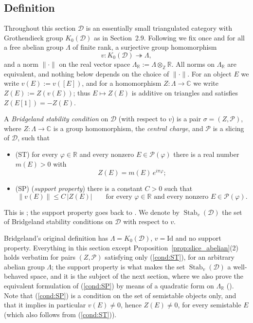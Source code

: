 \documentclass[12pt]{amsart}
\makeatletter
\newcommand{\condlabel}[2]{\phantomsection\def\@currentlabel{#1}\label{#2}\textup{(#1)}}
\newcommand{\condref}[1]{\textup{(\ref{#1})}}
\newenvironment{remark}{{\textbf{Remark.}}}
\numberwithin{theorem}{section}
\theoremstyle{definition}
\newcommand{\CC}{\mathbb{C}}
\newcommand{\RR}{\mathbb{R}}
\newcommand{\ZZ}{\mathbb{Z}}
\newcommand{\calP}{\mathcal{P}}
\newcommand{\id}{\mathrm{Id}}
\newcommand{\Kgroup}{K_0}
\newcommand{\calD}{\mathcal{D}}
\makeatother
\begin{document}
	\subsection{Definition}

	Throughout this section $\calD$ is an essentially small triangulated category with Grothendieck group $\Kgroup(\calD)$ as in Section~2.9.
	Following \cite[\S 5.2]{MS17} we fix once and for all a free abelian group $\Lambda$ of finite rank, a surjective group homomorphism
	\[
	v \colon \Kgroup(\calD) \twoheadrightarrow \Lambda ,
	\]
	and a norm $\| \cdot \|$ on the real vector space $\Lambda_{\RR} := \Lambda \otimes_{\ZZ} \RR$.
	All norms on $\Lambda_{\RR}$ are equivalent, and nothing below depends on the choice of $\| \cdot \|$.
	For an object $E$ we write $v(E) := v([E])$, and for a homomorphism $Z \colon \Lambda \to \CC$ we write $Z(E) := Z(v(E))$;
	thus $E \mapsto Z(E)$ is additive on triangles and satisfies $Z(E[1]) = -Z(E)$.

	A \emph{Bridgeland stability condition} on $\calD$ (with respect to $v$) is a pair $\sigma = (Z, \calP)$, where $Z \colon \Lambda \to \CC$ is a group homomorphism, the \emph{central charge}, and $\calP$ is a slicing of $\calD$, such that
	\begin{itemize}
		\item[] \condlabel{ST}{cond:ST} for every $\varphi \in \RR$ and every nonzero $E \in \calP(\varphi)$ there is a real number $m(E) > 0$ with
		\[
		Z(E) = m(E) \, e^{i \pi \varphi} ;
		\]
		\item[] \condlabel{SP}{cond:SP} (\emph{support property}) there is a constant $C > 0$ such that
		\[
		\| v(E) \| \leqslant C \, |Z(E)| \qquad \text{for every } \varphi \in \RR \text{ and every nonzero } E \in \calP(\varphi) .
		\]
	\end{itemize}
	This is \cite[Def.~5.8]{MS17}; the support property goes back to \cite{KS08}.
	We denote by $\operatorname{Stab}_v(\calD)$ the set of Bridgeland stability conditions on $\calD$ with respect to $v$.

	\begin{remark}
		Bridgeland's original definition \cite[Def.~1.1 and Def.~5.1]{Bri07} has $\Lambda = \Kgroup(\calD)$, $v = \id$ and no support property.
		Everything in this section except Proposition~\ref{prop:slice_abelian}(2) holds verbatim for pairs $(Z, \calP)$ satisfying only \condref{cond:ST}, for an arbitrary abelian group $\Lambda$;
		the support property is what makes the set $\operatorname{Stab}_v(\calD)$ a well-behaved space, and it is the subject of the next section, where we also prove the equivalent formulation of \condref{cond:SP} by means of a quadratic form on $\Lambda_{\RR}$ (\cite[Exercise~5.10]{MS17}).
		Note that \condref{cond:SP} is a condition on the set of semistable objects only, and that it implies in particular $v(E) \neq 0$, hence $Z(E) \neq 0$, for every semistable $E$ (which also follows from \condref{cond:ST}).
	\end{remark}
\end{document}
